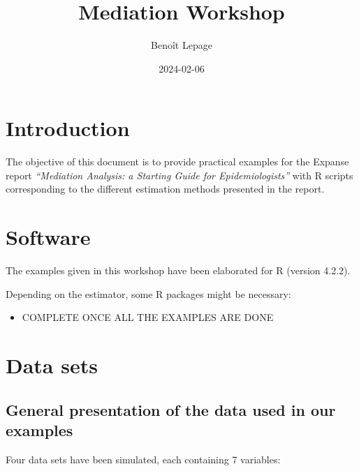 \documentclass[
]{book}
\title{Mediation Workshop}
\author{Benoît Lepage}
\date{2024-02-06}
\providecommand{\tightlist}{%
  \setlength{\itemsep}{0pt}\setlength{\parskip}{0pt}}
\begin{document}
\maketitle

{
\setcounter{tocdepth}{1}
\tableofcontents
}
\hypertarget{introduction}{%
\chapter{Introduction}\label{introduction}}

The objective of this document is to provide practical examples for the Expanse report \emph{``Mediation Analysis: a Starting Guide for Epidemiologists''} with R scripts corresponding to the different estimation methods presented in the report.

\hypertarget{software}{%
\chapter{Software}\label{software}}

The examples given in this workshop have been elaborated for R (version 4.2.2).

Depending on the estimator, some R packages might be necessary:

\begin{itemize}
\tightlist
\item
  COMPLETE ONCE ALL THE EXAMPLES ARE DONE
\end{itemize}

\hypertarget{data-sets}{%
\chapter{Data sets}\label{data-sets}}

\hypertarget{general-presentation-of-the-data-used-in-our-examples}{%
\section{General presentation of the data used in our examples}\label{general-presentation-of-the-data-used-in-our-examples}}

Four data sets have been simulated, each containing 7 variables:
\end{document}
